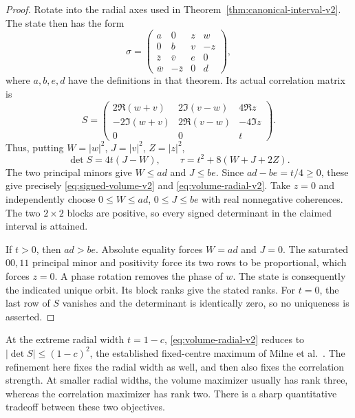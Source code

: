 \begin{proof}
Rotate into the radial axes used in
Theorem~\ref{thm:canonical-interval-v2}. The state then has the form
\begin{equation}\label{eq:aligned-volume-v2}
 \sigma=\begin{pmatrix}
 a&0&z&w\\0&b&v&-z\\
 \overline z&\overline v&e&0\\
 \overline w&-\overline z&0&d
 \end{pmatrix},
\end{equation}
where $a,b,e,d$ have the definitions in that theorem. Its actual correlation
matrix is
\[
 S=\begin{pmatrix}
 2\Re(w+v)&2\Im(v-w)&4\Re z\\
 -2\Im(w+v)&2\Re(v-w)&-4\Im z\\
 0&0&t
 \end{pmatrix}.
\]
Thus, putting $W=|w|^2$, $J=|v|^2$, $Z=|z|^2$,
\begin{equation}\label{eq:volume-coordinates-v2}
 \det S=4t(J-W),\qquad
 \tau=t^2+8(W+J+2Z).
\end{equation}
The two principal minors give $W\leq ad$ and $J\leq be$.
Since $ad-be=t/4\geq0$, these give precisely
\eqref{eq:signed-volume-v2} and \eqref{eq:volume-radial-v2}.
Take $z=0$ and independently choose
$0\leq W\leq ad$, $0\leq J\leq be$ with real nonnegative coherences.
The two $2\times2$ blocks are positive, so every signed determinant in the
claimed interval is attained.

If $t>0$, then $ad>be$. Absolute equality forces $W=ad$ and $J=0$.
The saturated $00,11$ principal minor and positivity force its two rows to
be proportional, which forces $z=0$. A phase rotation removes the phase
of $w$. The state is consequently the indicated unique orbit. Its block
ranks give the stated ranks. For $t=0$, the last row of $S$ vanishes and
the determinant is identically zero, so no uniqueness is asserted.
\end{proof}

At the extreme radial width $t=1-c$, \eqref{eq:volume-radial-v2} reduces to
$|\det S|\leq(1-c)^2$, the established fixed-centre maximum
of Milne et al.~\cite{milnevolume}. The refinement here fixes the radial
width as well, and then also fixes the correlation strength.
At smaller radial widths, the volume maximizer usually
has rank three, whereas the correlation maximizer has rank two. There is a
sharp quantitative tradeoff between these two objectives.

